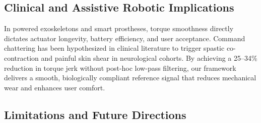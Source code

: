 \documentclass[fleqn,10pt]{wlscirep}
\begin{document}
\subsection{Clinical and Assistive Robotic Implications}

In powered exoskeletons and smart prostheses, torque smoothness directly dictates actuator longevity, battery efficiency, and user acceptance\cite{baud2021review}. Command chattering has been hypothesized in clinical literature to trigger spastic co-contraction and painful skin shear in neurological cohorts\cite{tucker2015control}. By achieving a 25--34\% reduction in torque jerk without post-hoc low-pass filtering, our framework delivers a smooth, biologically compliant reference signal that reduces mechanical wear and enhances user comfort.

\subsection{Limitations and Future Directions}
\end{document}
